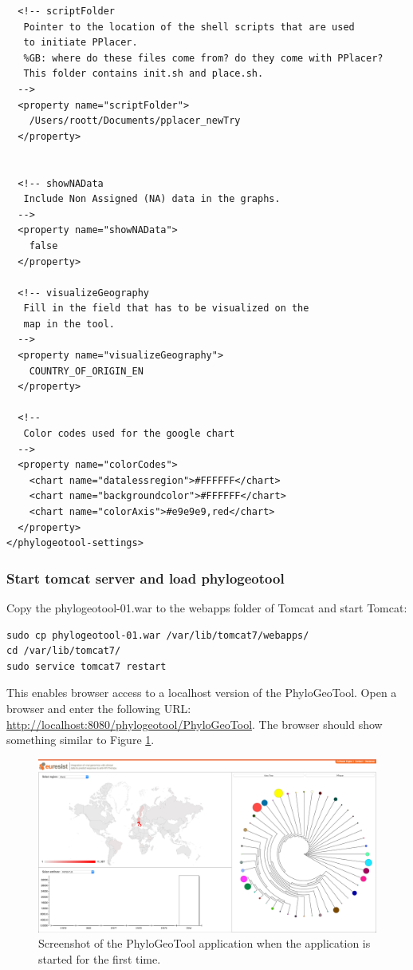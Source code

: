 \documentclass[a4paper, 11pt]{article} %
\begin{document}
\begin{verbatim}
  <!-- scriptFolder
   Pointer to the location of the shell scripts that are used 
   to initiate PPlacer.
   %GB: where do these files come from? do they come with PPlacer?
   This folder contains init.sh and place.sh.
  -->
  <property name="scriptFolder">
    /Users/roott/Documents/pplacer_newTry
  </property>


  <!-- showNAData 
   Include Non Assigned (NA) data in the graphs.
  -->
  <property name="showNAData">
    false
  </property>
  
  <!-- visualizeGeography 
   Fill in the field that has to be visualized on the 
   map in the tool.
  -->
  <property name="visualizeGeography">
  	COUNTRY_OF_ORIGIN_EN
  </property>

  <!-- 
   Color codes used for the google chart
  -->
  <property name="colorCodes">
    <chart name="datalessregion">#FFFFFF</chart>
    <chart name="backgroundcolor">#FFFFFF</chart>    
    <chart name="colorAxis">#e9e9e9,red</chart>
  </property>
</phylogeotool-settings>
\end{verbatim}


\subsubsection{Start tomcat server and load phylogeotool}

Copy the phylogeotool-01.war to the webapps folder of Tomcat and start Tomcat:
\begin{verbatim}
sudo cp phylogeotool-01.war /var/lib/tomcat7/webapps/
cd /var/lib/tomcat7/
sudo service tomcat7 restart
\end{verbatim}
This enables browser access to a localhost version of the PhyloGeoTool.
Open a browser and enter the following URL: \url{http://localhost:8080/phylogeotool/PhyloGeoTool}.
The browser should show something similar to Figure \ref{fig:01}.


\begin{figure}[!htbp]
\includegraphics[scale=0.19]{images/defaultScreenshot.png}
\caption{Screenshot of the PhyloGeoTool application when the application is started for the first time.}
\label{fig:01} 
\end{figure}
\end{document}
